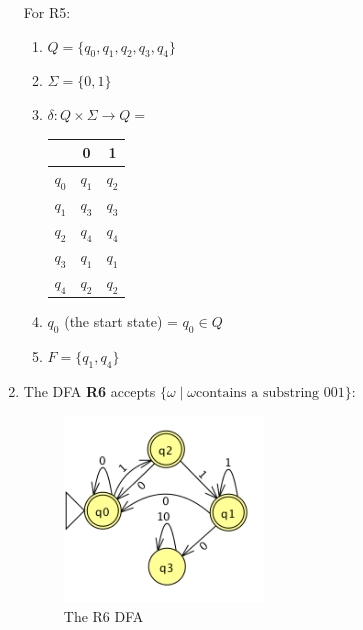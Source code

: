 \documentclass[11pt,a4paper]{article}
\begin{document}
\begin{enumerate}
                For R5:
                \begin{enumerate}
                    \item $Q = \{q_0, q_1, q_2, q_3, q_4\}$
                    \item $\Sigma = \{0, 1\}$
                    \item $\delta \colon Q \times \Sigma \rightarrow Q =$
                    \begin{tabular}{c|c|c}
                         & 0 & 1 \\ \hline
                        $q_0$ & $q_1$ & $q_2$ \\ \hline
                        $q_1$ & $q_3$ & $q_3$ \\ \hline
                        $q_2$ & $q_4$ & $q_4$ \\ \hline
                        $q_3$ & $q_1$ & $q_1$ \\ \hline
                        $q_4$ & $q_2$ & $q_2$ \\ \hline
                    \end{tabular}
                    \item $q_0$ (the start state) = $q_0 \in Q$
                    \item $F = \{q_1, q_4\}$
                \end{enumerate}

            \item The DFA \textbf{R6} accepts $\{\omega\mid\omega\text{contains a substring 001}\}$:\\
                \begin{figure}[H]
                    \centering
                    \includegraphics[width=0.50\textwidth]{A6}
                    \caption{The R6 DFA}
                \end{figure}


\end{enumerate}
\end{document}
